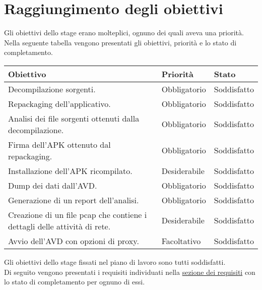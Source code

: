 

\section{Raggiungimento degli obiettivi}\label{sec:raggiungimento-degli-obiettivi}
Gli obiettivi dello stage erano molteplici, ognuno dei quali aveva una priorità.
Nella seguente tabella vengono presentati gli obiettivi, priorità e lo stato di completamento.

\begin{longtable}{|C{7cm}|C{3cm}|C{3cm}|}
    \hline
    \textbf{Obiettivo} &
    \textbf{Priorità} &
    \textbf{Stato} \\\hline
    Decompilazione sorgenti.
    & Obbligatorio & Soddisfatto \\\hline
    Repackaging dell'applicativo.
    & Obbligatorio & Soddisfatto \\\hline
    Analisi dei file sorgenti ottenuti dalla decompilazione.
    & Obbligatorio & Soddisfatto \\\hline
    Firma dell'APK ottenuto dal repackaging.
    & Obbligatorio & Soddisfatto \\\hline
    Installazione dell'APK ricompilato.
    & Desiderabile & Soddisfatto \\\hline
    Dump dei dati dall'AVD.
    & Obbligatorio & Soddisfatto \\\hline
    Generazione di un report dell'analisi.
    & Obbligatorio & Soddisfatto \\\hline
    Creazione di un file \gls{pcap} che contiene i dettagli delle attività di rete.
    & Desiderabile & Soddisfatto \\\hline
    Avvio dell'AVD con opzioni di proxy.
    & Facoltativo  & Soddisfatto \\\hline
\end{longtable}
Gli obiettivi dello stage fissati nel piano di lavoro sono tutti soddisfatti.\\
Di seguito vengono presentati i requisiti individuati nella  \hyperref[subsec:classificazione]{sezione dei requisiti} con lo stato di completamento per ognuno di essi.
